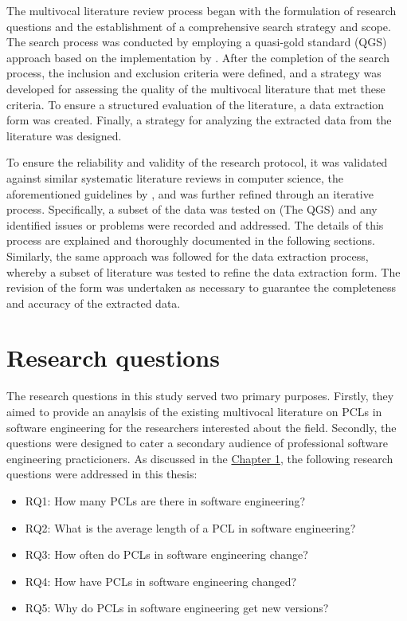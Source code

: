 The multivocal literature review process began with the formulation of research questions and the establishment of a comprehensive search strategy and scope. The search process was conducted by employing a quasi-gold standard (QGS) approach based on the implementation by \cite{qgs}. After the completion of the search process, the inclusion and exclusion criteria were defined, and a strategy was developed for assessing the quality of the multivocal literature that met these criteria. To ensure a structured evaluation of the literature, a data extraction form was created. Finally, a strategy for analyzing the extracted data from the literature was designed.

 To ensure the reliability and validity of the research protocol, it was validated against similar systematic literature reviews in computer science, the aforementioned guidelines by \cite{kitchenham2007}, and was further refined through an iterative process. Specifically, a subset of the data was tested on (The QGS) and any identified issues or problems were recorded and addressed. The details of this process are explained and thoroughly documented in the following sections. Similarly, the same approach was followed for the data extraction process, whereby a subset of literature was tested to refine the data extraction form. The revision of the form was undertaken as necessary to guarantee the completeness and accuracy of the extracted data.

\section{Research questions}
The research questions in this study served two primary purposes. Firstly, they aimed to provide an anaylsis of the existing multivocal literature on PCLs in software engineering for the researchers interested about the field. Secondly, the questions were designed to cater a secondary audience of professional software engineering practicioners. As discussed in the \hyperref[intro]{Chapter 1}, the following research questions were addressed in this thesis:

\begin{itemize}
	\item RQ1: How many PCLs are there in software engineering?
	\item RQ2: What is the average length of a PCL in software engineering?
	\item RQ3: How often do PCLs in software engineering change?
	\item RQ4: How have PCLs in software engineering changed?
	\item RQ5: Why do PCLs in software engineering get new versions?
\end{itemize}

